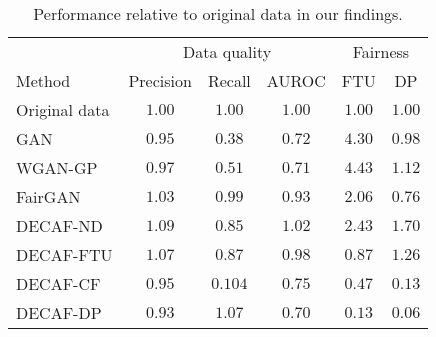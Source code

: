     \begin{table}[h]\centering
    \caption{Performance relative to original data in our findings.}
    \label{tab:exp2}
    \begin{tabular}{l|ccccc}
    
    \hline 
                    & \multicolumn{3}{c|}{Data quality}                & \multicolumn{2}{c}{Fairness} \\ \cline{2-6} 
    Method          & Precision & Recall & \multicolumn{1}{c|}{AUROC} & FTU           & DP           \\ \hline   
    Original data & $1.00$     & $1.00$  & \multicolumn{1}{c|}{$1.00$} & $1.00$  & $1.00$      \\
    GAN             & $0.95$ & $0.38$ & \multicolumn{1}{c|}{$0.72$} & $4.30$   & $0.98$  \\
    WGAN-GP         & $0.97$ & $0.51$ & \multicolumn{1}{c|}{$0.71$} & $4.43$   & $1.12$  \\
    FairGAN         & $1.03$ & $0.99$ & \multicolumn{1}{c|}{$0.93$} & $2.06$   & $0.76$  \\
    DECAF-ND        & $1.09$ & $0.85$ & \multicolumn{1}{c|}{$1.02$} & $2.43$   & $1.70$  \\
    DECAF-FTU       & $1.07$ & $0.87$ & \multicolumn{1}{c|}{$0.98$} & $0.87$   & $1.26$  \\
    DECAF-CF        & $0.95$ & $0.104$ & \multicolumn{1}{c|}{$0.75$} & $0.47$   & $0.13$  \\
    DECAF-DP        & $0.93$ & $1.07$ & \multicolumn{1}{c|}{$0.70$} & $0.13$   & $0.06$      \\ 
    \hline
    \end{tabular}
    \end{table}
    
